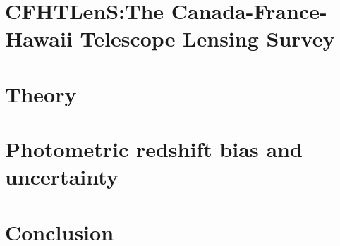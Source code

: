 \documentclass[preprint]{aastex}
\begin{document}
\section{CFHTLenS:The Canada-France-Hawaii Telescope Lensing Survey}
\label{sec:cfhtlens}


\section{Theory}
\label{sec:theory}


\section{Photometric redshift bias and uncertainty}
\label{sec:photoz}


\section{Conclusion}



\end{document}
